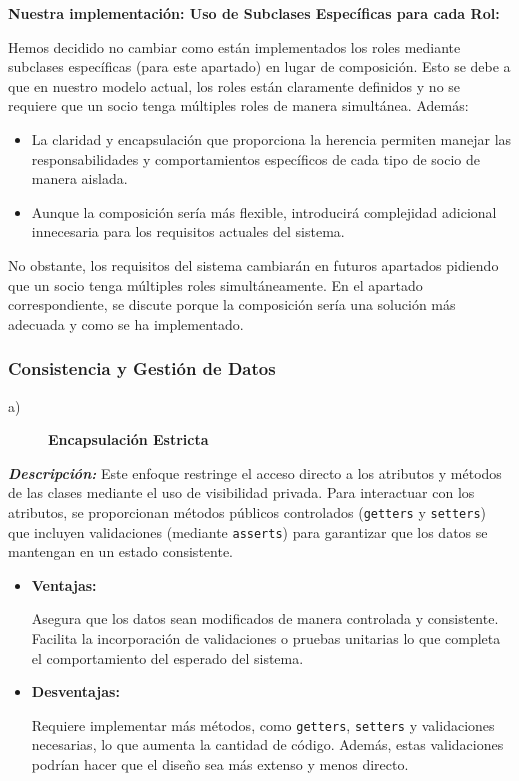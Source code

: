 \textbf{Nuestra implementación: Uso de Subclases Específicas para cada Rol:}\par  
\vspace{0.15cm}
Hemos decidido no cambiar como están implementados los roles mediante subclases específicas 
(para este apartado) en lugar de composición. Esto se debe a que en nuestro modelo actual, 
los roles están claramente definidos y no se requiere que un socio tenga múltiples roles de 
manera simultánea. Además:
\begin{itemize}
    \item La claridad y encapsulación que proporciona la herencia permiten manejar las responsabilidades y comportamientos específicos de cada tipo de socio de manera aislada.
    \item Aunque la composición sería más flexible, introducirá complejidad adicional innecesaria para los requisitos actuales del sistema.
\end{itemize}

No obstante, los requisitos del sistema cambiarán en futuros apartados pidiendo que un socio
tenga múltiples roles simultáneamente. En el apartado correspondiente, se discute porque 
la composición sería una solución más adecuada y como se ha implementado.




\subsubsection{Consistencia y Gestión de Datos}

\begin{description}
    \item[a)] \textbf{Encapsulación Estricta}
\end{description}

\textit{\textbf{Descripción:}}  
Este enfoque restringe el acceso directo a los atributos y métodos de las clases mediante 
el uso de visibilidad privada. Para interactuar con los atributos, se proporcionan métodos 
públicos controlados (\texttt{getters} y \texttt{setters}) que incluyen validaciones (mediante 
\texttt{asserts}) para garantizar que los datos se mantengan en un estado consistente.

\begin{itemize}
    \item \textbf{Ventajas:}\par
    Asegura que los datos sean modificados de manera controlada y consistente. Facilita la 
    incorporación de validaciones o pruebas unitarias lo que completa el comportamiento del
    esperado del sistema.
    \item \textbf{Desventajas:}\par
    Requiere implementar más métodos, como \texttt{getters}, \texttt{setters} y validaciones 
    necesarias, lo que aumenta la cantidad de código. Además, estas validaciones podrían hacer 
    que el diseño sea más extenso y menos directo.
\end{itemize}

